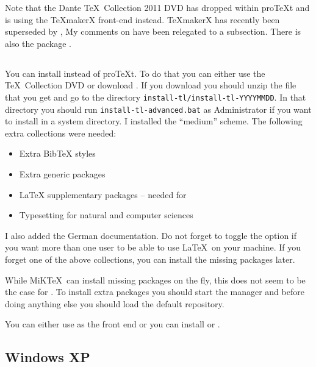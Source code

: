 Note that the Dante \TeX\ Collection 2011 DVD has dropped
\TeXnicCenter within pro\TeX t and is using the \TeX makerX front-end
instead. \TeX makerX has recently been superseded by \TeXstudio, My
comments on \TeXnicCenter have been relegated to a subsection. There
is also the package \TeXmaker.

\subsection{\TeXLive}
\label{sec:app:texlive}

You can install \TeXLive instead of pro\TeX t. To do that you can
either use the \TeX\ Collection DVD or download \TeXLive. If you
download \TeXLive you should unzip the file that you get and go to the
directory \texttt{install-tl/install-tl-YYYYMMDD}. In that directory you
should run \texttt{install-tl-advanced.bat} as Administrator if you want to install
\TeXLive in a system directory. I installed the \enquote{medium}
scheme. The following extra collections were needed:
\begin{itemize}
\item \textsf{Extra BibTeX styles}
\item \textsf{Extra generic packages}
\item \textsf{LaTeX supplementary packages} -- needed for 
\item \textsf{Typesetting for natural and computer sciences}
\end{itemize}
I also added the German documentation. Do not forget to toggle the
option  if you want more than one user to be able to
use \LaTeX\ on your machine. If you forget one of the above
collections, you can install the missing packages later.

While MiK\TeX\ can install missing packages on the fly, this does not
seem to be the case for \TeXLive. To install extra packages you should
start the \TeXLive manager and before doing anything else you should
load the default repository.

You can either use \TeXworks as the front end or you can install
\TeXstudio or \TeXmaker.


\subsection{Windows XP}

